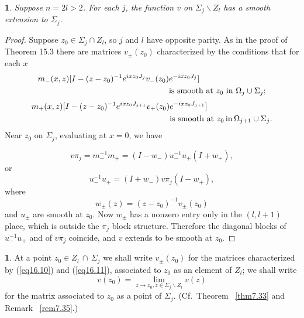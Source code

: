 \documentclass{surv-l}
\theoremstyle{plain}
\newtheorem{prop}[theorem]{\sc{Proposition}}
\theoremstyle{definition}
\newtheorem{definition}[theorem]{\sc{Definition}}
\numberwithin{equation}{chapter}
\begin{document}
\begin{prop}\label{prop16.9}
Suppose $n=2l>2$.  For each $j$,  the function $v$  on $\Sigma_{j}\backslash Z_{l}$ has a smooth extension to $\Sigma_{j}$.
\end{prop}

\begin{proof}

Suppose $z_{0}\in\Sigma_{j}\cap Z_{l}$, so $j$ and $l$ have opposite parity. As in the proof of Theorem 15.3 there are matrices $v_{\pm}(z_{0})$ characterized by the conditions that for each $x$
\setcounter{equation}{9}
\begin{align}\label{eq16.10}
m_{-}(x, z)[I-(z-z_{0})^{-1}e^{ixz_{0}J_{j}}v_{-}(z_{0})&e^{-ixz_{0}J_{j}}]\\
&\text{is smooth  at}\ z_{0} \ \mathrm{in}\ \Omega_{j}  \cup\Sigma_{j}; \notag
\end{align}
\begin{align}\label{eq16.11}
m_+(x, z)[I-(z -z_{0})^{-1}e^{ixz_{0}J_{j+1}}v_{+}(z_{0})&e^{-ixz_{0}J_{j+1}}]\\
&\text{is smooth at } z_{0}\, \mathrm{in}\, \Omega_{j+1} \cup\Sigma_{j}. \notag
\end{align}
Near $z_{0}$ on $\Sigma_{j}$, evaluating at $x=0$, we have

\begin{equation*}
v\pi_{j}=m_{-}^{-1}m_{+}=(I-w_{-})u_{-}^{-1}u_{+}(I+w_{+}),
\end{equation*}
or
\begin{equation*}
u_{-}^{-1}u_{+}=(I+w_{-})v\pi_{j}(I-w_{+}),
\end{equation*}
where
\begin{equation*}
w_{\pm}(z)=(z-z_{0})^{-1}v_{\pm}(z_{0})
\end{equation*}
and $ u_{\pm}$ are smooth at $z_{0}$. Now $w_{\pm}$ has a nonzero entry only in the $(l, l+1)$ place, which is outside the $\pi_{j}$ block structure. Therefore the diagonal blocks of $u_{-}^{-1}u_{+}$ and of $v\pi_{j}$ coincide, and $v$ extends to be smooth at $z_{0}$.
\end{proof}
\setcounter{theorem}{11}
\begin{definition}\label{def16.12}
At a point $z_{0}\in Z_{l}\,\cap\,\Sigma_{j}$ we shall write $v_{\pm}(z_{0})$ for the matrices characterized by (\ref{eq16.10}) and (\ref{eq16.11}), associated to $z_{0}$ as an element of $Z_{l}$; we shall write
\begin{equation*}
v(z_{0})=\lim_{z\rightarrow z_{0},z\in\Sigma_{j}\backslash Z_{l}}v(z)
\end{equation*}
for the matrix associated to $z_{0}$ as a point of $\Sigma_{j}$. (Cf.~Theorem ~\ref{thm7.33} and Remark ~\ref{rem7.35}.)
\end{definition}
\end{document}
